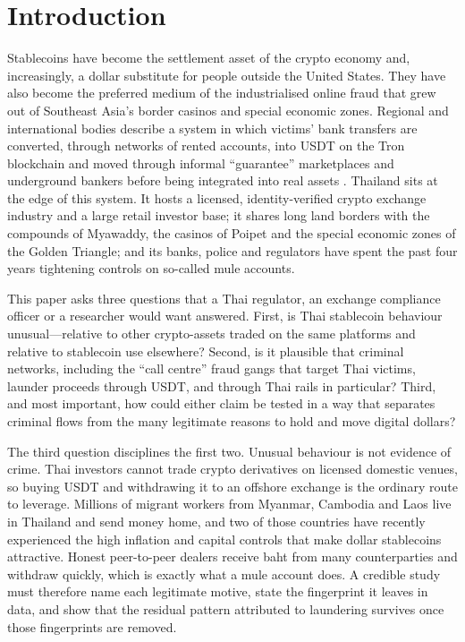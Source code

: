\section{Introduction}\label{sec:intro}

Stablecoins have become the settlement asset of the crypto economy and, increasingly, a dollar substitute for people
outside the United States. They have also become the preferred medium of the industrialised online fraud that grew
out of Southeast Asia's border casinos and special economic zones. Regional and international bodies describe a
system in which victims' bank transfers are converted, through networks of rented accounts, into USDT on the Tron
blockchain and moved through informal ``guarantee'' marketplaces and underground bankers before being integrated into
real assets \citep{unodc2024casinos,unodc2025inflection,fatf2023cyberfraud}. Thailand sits at the edge of this system.
It hosts a licensed, identity-verified crypto exchange industry and a large retail investor base; it shares long land
borders with the compounds of Myawaddy, the casinos of Poipet and the special economic zones of the Golden Triangle;
and its banks, police and regulators have spent the past four years tightening controls on so-called mule accounts.

This paper asks three questions that a Thai regulator, an exchange compliance officer or a researcher would want
answered. First, is Thai stablecoin behaviour unusual---relative to other crypto-assets traded on the same platforms
and relative to stablecoin use elsewhere? Second, is it plausible that criminal networks, including the ``call
centre'' fraud gangs that target Thai victims, launder proceeds through USDT, and through Thai rails in particular?
Third, and most important, how could either claim be tested in a way that separates criminal flows from the many
legitimate reasons to hold and move digital dollars?

The third question disciplines the first two. Unusual behaviour is not evidence of crime. Thai investors cannot trade
crypto derivatives on licensed domestic venues, so buying USDT and withdrawing it to an offshore exchange is the
ordinary route to leverage. Millions of migrant workers from Myanmar, Cambodia and Laos live in Thailand and send money
home, and two of those countries have recently experienced the high inflation and capital controls that make dollar
stablecoins attractive. Honest peer-to-peer dealers receive baht from many counterparties and withdraw quickly, which
is exactly what a mule account does. A credible study must therefore name each legitimate motive, state the
fingerprint it leaves in data, and show that the residual pattern attributed to laundering survives once those
fingerprints are removed.

